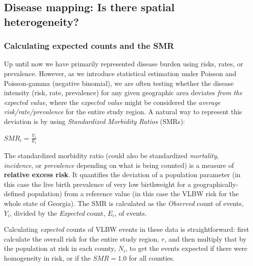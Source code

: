 \documentclass[
]{book}
\begin{document}
\hypertarget{disease-mapping-is-there-spatial-heterogeneity}{%
\subsection{Disease mapping: Is there spatial heterogeneity?}\label{disease-mapping-is-there-spatial-heterogeneity}}

\hypertarget{calculating-expected-counts-and-the-smr}{%
\subsubsection{Calculating expected counts and the SMR}\label{calculating-expected-counts-and-the-smr}}

Up until now we have primarily represented disease burden using risks, rates, or prevalence. However, as we introduce statistical estimation under Poisson and Poisson-gamma (negative binomial), we are often testing whether the disease intensity (risk, rate, prevalence) for any given geographic area deviates \emph{from the expected value}, where the \emph{expected value} might be considered the \emph{average risk/rate/prevalence} for the entire study region. A natural way to represent this deviation is by using \emph{Standardized Morbidity Ratios} (SMRs):

\(SMR_i=\frac{Y_i}{E_i}\)

The standardized morbidity ratio (could also be standardized \emph{mortality}, \emph{incidence}, or \emph{prevalence} depending on what is being counted) is a measure of \textbf{relative excess risk}. It quantifies the deviation of a population parameter (in this case the live birth prevalence of very low birthweight for a geographically-defined population) from a reference value (in this case the VLBW risk for the whole state of Georgia). The SMR is calculated as the \emph{Observed} count of events, \(Y_i\), divided by the \emph{Expected} count, \(E_i\), of events.

Calculating \emph{expected} counts of VLBW events in these data is straightforward: first calculate the overall risk for the entire study region, \(r\), and then multiply that by the population at risk in each county, \(N_i\), to get the events expected if there were homogeneity in risk, or if the \(SMR=1.0\) for all counties.
\end{document}
